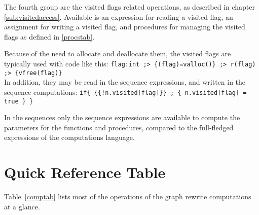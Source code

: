 The fourth group are the visited flags related operations,
as described in chapter \ref{sub:visitedaccess}.
Available is an expression for reading a visited flag, an assignment for writing a visited flag, and procedures for managing the visited flags as defined in \ref{procstab}.

\begin{example}
Because of the need to allocate and deallocate them, the visited flags are typically used with code like this:
\verb#flag:int ;> {(flag)=valloc()} ;> r(flag) ;> {vfree(flag)}#\\
In addition, they may be read in the sequence expressions, and written in the sequence computations:
\verb#if{ {{!n.visited[flag]}} ; { n.visited[flag] = true } }#
\end{example}

In the sequences only the sequence expressions are available to compute the parameters for the functions and procedures, compared to the full-fledged expressions of the computations language.


\section{Quick Reference Table}

Table~\ref{comptab} lists most of the operations of the graph rewrite computations at a glance.

